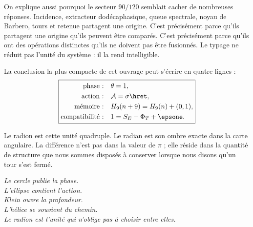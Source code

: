 On explique aussi pourquoi le secteur \(90/120\) semblait cacher de nombreuses
réponses. Incidence, extracteur dodécaphasique, queue spectrale, noyau de
Barbero, tours et retenue partagent une origine. C'est précisément parce qu'ils partagent une origine
qu'ils peuvent être comparés. C'est précisément parce qu'ils ont des opérations distinctes qu'ils ne doivent pas
être fusionnés. Le typage ne réduit pas l'unité du système : il la rend intelligible.

La conclusion la plus compacte de cet ouvrage peut s'écrire en quatre lignes :
\[
\boxed{
\begin{aligned}
\text{phase :}\quad&\theta=1,\\
\text{action :}\quad&\mathcal A=\sigma\hret,\\
\text{mémoire :}\quad&H_9(n+9)=H_9(n)+(0,1),\\
\text{compatibilité :}\quad&1=S_E-\Phi_T+\epsone.
\end{aligned}}
\]

Le radion est cette unité quadruple. Le radian est son ombre exacte dans la carte
angulaire. La différence n'est pas dans la valeur de \(\pi\) ; elle réside dans la quantité de
structure que nous sommes disposés à conserver lorsque nous disons qu'un tour s'est
fermé.

\vspace{2\baselineskip}
\begin{center}
\begin{minipage}{.82\textwidth}
\centering\large\itshape\color{RadNavy}
Le cercle publie la phase.\\
L'ellipse contient l'action.\\
Klein ouvre la profondeur.\\
L'hélice se souvient du chemin.\\[.7em]
Le radion est l'unité qui n'oblige pas à choisir entre elles.
\end{minipage}
\end{center}
